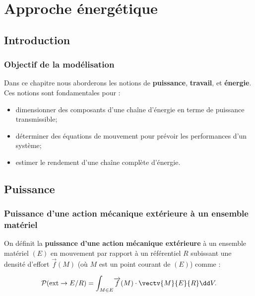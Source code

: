 \setchapterpreamble[u]{\margintoc}
\setcounter{chapter}{1}

\chapter{Approche énergétique}




\section{Introduction}
\subsection{Objectif de la modélisation}
Dans ce chapitre nous aborderons les notions de \textbf{puissance}, \textbf{travail}, et \textbf{énergie}. Ces notions sont fondamentales pour :
\begin{itemize}
\item dimensionner des composants d'une chaîne d'énergie en terme de puissance transmissible;
\item déterminer des équations de mouvement pour prévoir les performances d'un système;
\item estimer le rendement d'une chaîne complète d'énergie.
\end{itemize}



\section{Puissance}
\subsection{Puissance d'une action mécanique extérieure à un ensemble matériel}
\begin{defi}
On définit la \textbf{puissance d'une action mécanique extérieure} à un ensemble matériel $(E)$ en mouvement par rapport à un référentiel $R$ subissant une densité d'effort $\overrightarrow{f}(M)$ (où $M$ est un point courant de $(E)$) comme :

$$
\mathcal{P}(\text{ext} \rightarrow E/R)=\displaystyle{\int_{M\in E}}\overrightarrow{f}(M)\cdot \vectv{M}{E}{R}%
\dd V.
$$
\end{defi}

